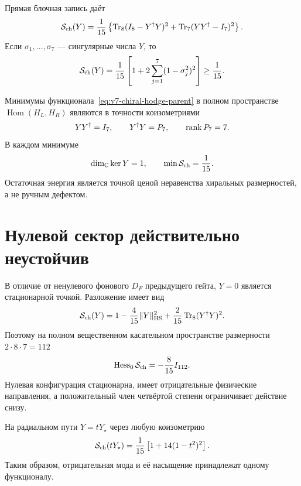 Прямая блочная запись даёт
\begin{equation}
 \mathcal S_{\rm ch}(Y)
 =\frac1{15}\left\{
 \operatorname{Tr}_8(I_8-Y^\dagger Y)^2
 +\operatorname{Tr}_7(YY^\dagger-I_7)^2
 \right\}.
 \label{eq:v7-chiral-hodge-block-action}
\end{equation}
Если $\sigma_1,\ldots,\sigma_7$ --- сингулярные числа $Y$, то
\begin{equation}
 \mathcal S_{\rm ch}(Y)
 =\frac1{15}\left[
 1+2\sum_{j=1}^7(1-\sigma_j^2)^2
 \right]\ge\frac1{15}.
 \label{eq:v7-chiral-singular-value-action}
\end{equation}

\begin{theorem}
Минимумы функционала~\eqref{eq:v7-chiral-hodge-parent} в полном пространстве
$\operatorname{Hom}(H_L,H_R)$ являются в точности коизометриями
\begin{equation}
 YY^\dagger=I_7,
 \qquad
 Y^\dagger Y=P_7,
 \qquad
 \operatorname{rank} P_7=7.
 \label{eq:v7-chiral-coisometry-vacuum}
\end{equation}
В каждом минимуме
\begin{equation}
 \dim_{\mathbb C}\ker Y=1,
 \qquad
 \min\mathcal S_{\rm ch}=\frac1{15}.
 \label{eq:v7-chiral-kernel-one}
\end{equation}
Остаточная энергия является точной ценой неравенства хиральных
размерностей, а не ручным дефектом.
\end{theorem}

\section{Нулевой сектор действительно неустойчив}

В отличие от ненулевого фонового $D_F$ предыдущего гейта, $Y=0$ является
стационарной точкой. Разложение имеет вид
\begin{equation}
 \mathcal S_{\rm ch}(Y)
 =1-\frac4{15}\|Y\|_{\rm HS}^2
 +\frac2{15}\operatorname{Tr}_8(Y^\dagger Y)^2.
 \label{eq:v7-chiral-zero-expansion}
\end{equation}
Поэтому на полном вещественном касательном пространстве размерности
$2\cdot8\cdot7=112$
\begin{equation}
 \operatorname{Hess}_0\mathcal S_{\rm ch}
 =-\frac8{15}I_{112}.
 \label{eq:v7-chiral-negative-hessian}
\end{equation}
Нулевая конфигурация стационарна, имеет отрицательные физические направления,
а положительный член четвёртой степени ограничивает действие снизу.

На радиальном пути $Y=tY_\star$ через любую коизометрию
\begin{equation}
 \mathcal S_{\rm ch}(tY_\star)
 =\frac1{15}\left[1+14(1-t^2)^2\right].
 \label{eq:v7-chiral-radial-path}
\end{equation}
Таким образом, отрицательная мода и её насыщение принадлежат одному
функционалу.

